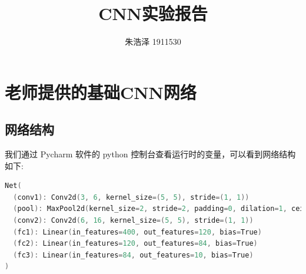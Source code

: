 \documentclass{article}
\begin{document}
\title{CNN实验报告}
\author{朱浩泽 1911530}
\maketitle
\section{老师提供的基础CNN网络}
\large
\subsection{网络结构}
我们通过 Pycharm 软件的 python 控制台查看运行时的变量，可以看到网络结构如下:
\begin{lstlisting}[language=c++]
Net(
  (conv1): Conv2d(3, 6, kernel_size=(5, 5), stride=(1, 1))
  (pool): MaxPool2d(kernel_size=2, stride=2, padding=0, dilation=1, ceil_mode=False)
  (conv2): Conv2d(6, 16, kernel_size=(5, 5), stride=(1, 1))
  (fc1): Linear(in_features=400, out_features=120, bias=True)
  (fc2): Linear(in_features=120, out_features=84, bias=True)
  (fc3): Linear(in_features=84, out_features=10, bias=True)
)
\end{lstlisting}
\end{document}
